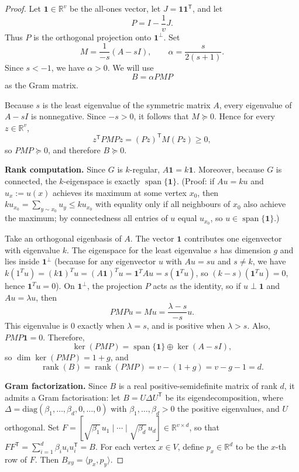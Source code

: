 \documentclass{article}
\theoremstyle{definition}
\begin{document}
\begin{proof}
Let $\mathbf 1\in\mathbb R^v$ be the all-ones vector, let $J=\mathbf 1\mathbf 1^{\mathsf T}$, and let
\[
P=I-\frac{1}{v}J.
\]
Thus $P$ is the orthogonal projection onto $\mathbf 1^\perp$. Set
\[
M=\frac{1}{-s}(A-sI),
\qquad
\alpha=\frac{s}{2(s+1)}.
\]
Since $s<-1$, we have $\alpha>0$. We will use
\[
B=\alpha PMP
\]
as the Gram matrix.

Because $s$ is the least eigenvalue of the symmetric matrix $A$, every eigenvalue of $A-sI$ is nonnegative. Since $-s>0$, it follows that $M\succeq 0$. Hence for every $z\in\mathbb R^v$,
\[
z^{\mathsf T}PMPz=(Pz)^{\mathsf T}M(Pz)\ge 0,
\]
so $PMP\succeq 0$, and therefore $B\succeq 0$.

\textbf{Rank computation.} Since $G$ is $k$-regular, $A\mathbf 1=k\mathbf 1$. Moreover, because $G$ is connected, the $k$-eigenspace is exactly $\operatorname{span}\{\mathbf 1\}$. (Proof: if $Au=ku$ and $u_x:=u(x)$ achieves its maximum at some vertex $x_0$, then $ku_{x_0}=\sum_{y\sim x_0}u_y\le ku_{x_0}$ with equality only if all neighbours of $x_0$ also achieve the maximum; by connectedness all entries of $u$ equal $u_{x_0}$, so $u\in\operatorname{span}\{\mathbf 1\}$.)

Take an orthogonal eigenbasis of $A$. The vector $\mathbf 1$ contributes one eigenvector with eigenvalue $k$. The eigenspace for the least eigenvalue $s$ has dimension $g$ and lies inside $\mathbf 1^\perp$ (because for any eigenvector $u$ with $Au = s u$ and $s \ne k$, we have $k(1^T u) = (k\mathbf{1})^T u = (A\mathbf{1})^T u = \mathbf{1}^T A u = s(\mathbf{1}^T u)$, so $(k-s)(\mathbf{1}^T u)=0$, hence $\mathbf{1}^T u = 0$). On $\mathbf 1^\perp$, the projection $P$ acts as the identity, so if $u\perp \mathbf 1$ and $Au=\lambda u$, then
\[
PMPu=Mu=\frac{\lambda-s}{-s}u.
\]
This eigenvalue is $0$ exactly when $\lambda=s$, and is positive when $\lambda>s$. Also, $PMP\mathbf 1=0$. Therefore,
\[
\ker(PMP)=\operatorname{span}\{\mathbf 1\}\oplus \ker(A-sI),
\]
so $\dim\ker(PMP)=1+g$, and
\[
\operatorname{rank}(B)=\operatorname{rank}(PMP)=v-(1+g)=v-g-1=d.
\]

\textbf{Gram factorization.} Since $B$ is a real positive-semidefinite matrix of rank $d$, it admits a Gram factorisation: let $B=U\Delta U^{\mathsf T}$ be its eigendecomposition, where $\Delta=\mathrm{diag}(\beta_1,\ldots,\beta_d,0,\ldots,0)$ with $\beta_1,\ldots,\beta_d>0$ the positive eigenvalues, and $U$ orthogonal. Set $F=[{\sqrt{\beta_1}}\,u_1\mid \cdots\mid {\sqrt{\beta_d}}\,u_d]\in\mathbb R^{v\times d}$, so that $FF^{\mathsf T}=\sum_{i=1}^d\beta_i u_i u_i^{\mathsf T}=B$. For each vertex $x\in V$, define $p_x\in\mathbb R^d$ to be the $x$-th row of $F$. Then $B_{xy}=\langle p_x,p_y\rangle$.


\end{proof}
\end{document}
